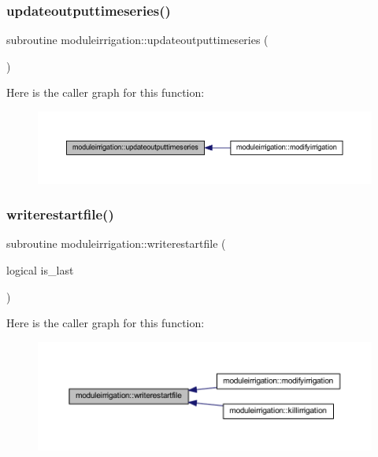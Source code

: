 \subsubsection{\texorpdfstring{updateoutputtimeseries()}{updateoutputtimeseries()}}
{\footnotesize\ttfamily subroutine moduleirrigation\+::updateoutputtimeseries (\begin{DoxyParamCaption}{ }\end{DoxyParamCaption})\hspace{0.3cm}{\ttfamily [private]}}

Here is the caller graph for this function\+:\nopagebreak
\begin{figure}[H]
\begin{center}
\leavevmode
\includegraphics[width=350pt]{namespacemoduleirrigation_af7ed2c0b32e93ac914c21fd4aa075fb6_icgraph}
\end{center}
\end{figure}
\mbox{\label{namespacemoduleirrigation_ae415b72207ef4095b22ebc9437d78482}} 
\subsubsection{\texorpdfstring{writerestartfile()}{writerestartfile()}}
{\footnotesize\ttfamily subroutine moduleirrigation\+::writerestartfile (\begin{DoxyParamCaption}\item[{logical}]{is\+\_\+last }\end{DoxyParamCaption})\hspace{0.3cm}{\ttfamily [private]}}

Here is the caller graph for this function\+:\nopagebreak
\begin{figure}[H]
\begin{center}
\leavevmode
\includegraphics[width=350pt]{namespacemoduleirrigation_ae415b72207ef4095b22ebc9437d78482_icgraph}
\end{center}
\end{figure}


